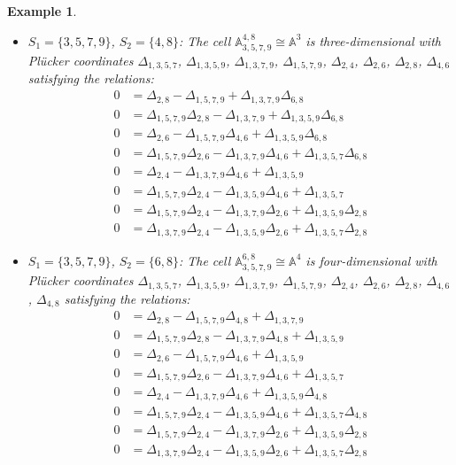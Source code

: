 \documentclass{amsart}
\newtheorem{example}[theorem]{Example}
\numberwithin{equation}{section}
\renewcommand{\AA}{\mathbb{A}}
\begin{document}
\begin{example}
\begin{itemize}
      \item $S_1=\{3,5,7,9\}$, $S_2=\{4,8\}$: The cell $\AA_{3,5,7,9}^{4,8} \cong \AA^3$ is three-dimensional with Pl\"ucker coordinates $\Delta_{1,3,5,7}$, $\Delta_{1,3,5,9}$, $\Delta_{1,3,7,9}$, $\Delta_{1,5,7,9}$, $\Delta_{2,4}$, $\Delta_{2,6}$, $\Delta_{2,8}$, $\Delta_{4,6}$ satisfying the relations:
      \begin{align*}
        0 &= \Delta_{2,8} - \Delta_{1,5,7,9} + \Delta_{1,3,7,9}\Delta_{6,8}\\
        0 &= \Delta_{1,5,7,9}\Delta_{2,8} - \Delta_{1,3,7,9} + \Delta_{1,3,5,9}\Delta_{6,8}\\
        0 &= \Delta_{2,6} - \Delta_{1,5,7,9}\Delta_{4,6} + \Delta_{1,3,5,9}\Delta_{6,8}\\
        0 &= \Delta_{1,5,7,9}\Delta_{2,6} - \Delta_{1,3,7,9}\Delta_{4,6} + \Delta_{1,3,5,7}\Delta_{6,8}\\
        0 &= \Delta_{2,4} - \Delta_{1,3,7,9}\Delta_{4,6} + \Delta_{1,3,5,9}\\
        0 &= \Delta_{1,5,7,9}\Delta_{2,4} - \Delta_{1,3,5,9}\Delta_{4,6} + \Delta_{1,3,5,7}\\
        0 &= \Delta_{1,5,7,9}\Delta_{2,4} - \Delta_{1,3,7,9}\Delta_{2,6} + \Delta_{1,3,5,9}\Delta_{2,8}\\
        0 &= \Delta_{1,3,7,9}\Delta_{2,4} - \Delta_{1,3,5,9}\Delta_{2,6} + \Delta_{1,3,5,7}\Delta_{2,8}
      \end{align*}

      \item $S_1=\{3,5,7,9\}$, $S_2=\{6,8\}$: The cell $\AA_{3,5,7,9}^{6,8} \cong \AA^4$ is four-dimensional with Pl\"ucker coordinates $\Delta_{1,3,5,7}$, $\Delta_{1,3,5,9}$, $\Delta_{1,3,7,9}$, $\Delta_{1,5,7,9}$, $\Delta_{2,4}$, $\Delta_{2,6}$, $\Delta_{2,8}$, $\Delta_{4,6}$, $\Delta_{4,8}$ satisfying the relations:
      \begin{align*}
        0 &= \Delta_{2,8} - \Delta_{1,5,7,9}\Delta_{4,8} + \Delta_{1,3,7,9}\\
        0 &= \Delta_{1,5,7,9}\Delta_{2,8} - \Delta_{1,3,7,9}\Delta_{4,8} + \Delta_{1,3,5,9}\\
        0 &= \Delta_{2,6} - \Delta_{1,5,7,9}\Delta_{4,6} + \Delta_{1,3,5,9}\\
        0 &= \Delta_{1,5,7,9}\Delta_{2,6} - \Delta_{1,3,7,9}\Delta_{4,6} + \Delta_{1,3,5,7}\\
        0 &= \Delta_{2,4} - \Delta_{1,3,7,9}\Delta_{4,6} + \Delta_{1,3,5,9}\Delta_{4,8}\\
        0 &= \Delta_{1,5,7,9}\Delta_{2,4} - \Delta_{1,3,5,9}\Delta_{4,6} + \Delta_{1,3,5,7}\Delta_{4,8}\\
        0 &= \Delta_{1,5,7,9}\Delta_{2,4} - \Delta_{1,3,7,9}\Delta_{2,6} + \Delta_{1,3,5,9}\Delta_{2,8}\\
        0 &= \Delta_{1,3,7,9}\Delta_{2,4} - \Delta_{1,3,5,9}\Delta_{2,6} + \Delta_{1,3,5,7}\Delta_{2,8}
      \end{align*}
    \end{itemize}
  \end{example}
\end{document}

